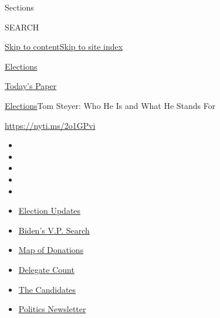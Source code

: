 Sections

SEARCH

\protect\hyperlink{site-content}{Skip to
content}\protect\hyperlink{site-index}{Skip to site index}

\href{https://www.nytimes.com/news-event/2020-election}{Elections}

\href{https://myaccount.nytimes.com/auth/login?response_type=cookie\&client_id=vi}{}

\href{https://www.nytimes.com/section/todayspaper}{Today's Paper}

\href{/news-event/2020-election}{Elections}\textbar{}Tom Steyer: Who He
Is and What He Stands For

\url{https://nyti.ms/2o1GPvi}

\begin{itemize}
\item
\item
\item
\item
\item
\end{itemize}

\begin{itemize}
\item
  \href{https://www.nytimes.com/2020/07/31/us/elections/biden-vs-trump.html?action=click\&pgtype=Article\&state=default\&region=TOP_BANNER\&context=storylines_menu}{Election
  Updates}
\item
  \href{https://www.nytimes.com/article/biden-vice-president-2020.html?action=click\&pgtype=Article\&state=default\&region=TOP_BANNER\&context=storylines_menu}{Biden's
  V.P. Search}
\item
  \href{https://www.nytimes.com/interactive/2020/07/24/us/politics/trump-biden-campaign-donors.html?action=click\&pgtype=Article\&state=default\&region=TOP_BANNER\&context=storylines_menu}{Map
  of Donations}
\item
  \href{https://www.nytimes.com/interactive/2020/us/elections/delegate-count-primary-results.html?action=click\&pgtype=Article\&state=default\&region=TOP_BANNER\&context=storylines_menu}{Delegate
  Count}
\item
  \href{https://www.nytimes.com/interactive/2019/us/politics/2020-presidential-candidates.html?action=click\&pgtype=Article\&state=default\&region=TOP_BANNER\&context=storylines_menu}{The
  Candidates}
\item
  \href{https://www.nytimes.com/newsletters/politics?action=click\&pgtype=Article\&state=default\&region=TOP_BANNER\&context=storylines_menu}{Politics
  Newsletter}
\end{itemize}

